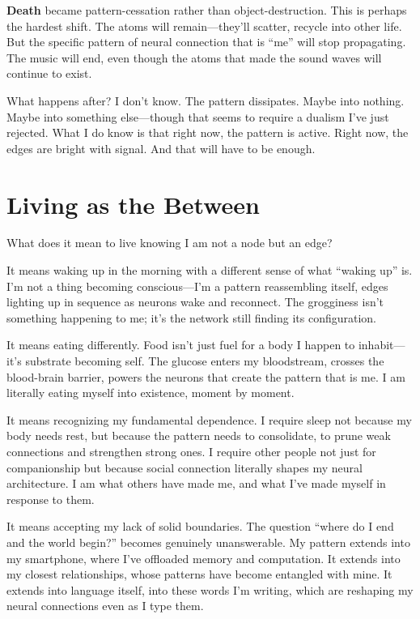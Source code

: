 \documentclass[12pt,a4paper]{article}
\begin{document}
\textbf{Death} became pattern-cessation rather than object-destruction. This is perhaps the hardest shift. The atoms will remain---they'll scatter, recycle into other life. But the specific pattern of neural connection that is ``me'' will stop propagating. The music will end, even though the atoms that made the sound waves will continue to exist.

What happens after? I don't know. The pattern dissipates. Maybe into nothing. Maybe into something else---though that seems to require a dualism I've just rejected. What I do know is that right now, the pattern is active. Right now, the edges are bright with signal. And that will have to be enough.

\section*{Living as the Between}

What does it mean to live knowing I am not a node but an edge?

It means waking up in the morning with a different sense of what ``waking up'' is. I'm not a thing becoming conscious---I'm a pattern reassembling itself, edges lighting up in sequence as neurons wake and reconnect. The grogginess isn't something happening to me; it's the network still finding its configuration.

It means eating differently. Food isn't just fuel for a body I happen to inhabit---it's substrate becoming self. The glucose enters my bloodstream, crosses the blood-brain barrier, powers the neurons that create the pattern that is me. I am literally eating myself into existence, moment by moment.

It means recognizing my fundamental dependence. I require sleep not because my body needs rest, but because the pattern needs to consolidate, to prune weak connections and strengthen strong ones. I require other people not just for companionship but because social connection literally shapes my neural architecture. I am what others have made me, and what I've made myself in response to them.

It means accepting my lack of solid boundaries. The question ``where do I end and the world begin?'' becomes genuinely unanswerable. My pattern extends into my smartphone, where I've offloaded memory and computation. It extends into my closest relationships, whose patterns have become entangled with mine. It extends into language itself, into these words I'm writing, which are reshaping my neural connections even as I type them.
\end{document}
